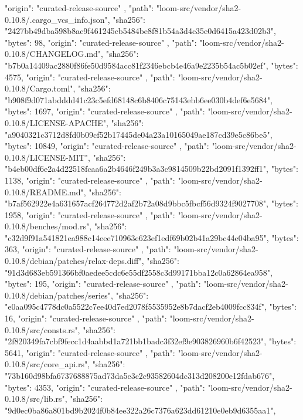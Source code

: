 {{      "origin": "curated-release-source"
    },
    {
      "path": "loom-src/vendor/sha2-0.10.8/.cargo_vcs_info.json",
      "sha256": "2427bb49dba598b8ac9f461245cb5484be8f81b54a3d4c35e0d6415a423d02b3",
      "bytes": 98,
      "origin": "curated-release-source"
    },
    {
      "path": "loom-src/vendor/sha2-0.10.8/CHANGELOG.md",
      "sha256": "b7b0a14409ac2880f86fe50d9584acc81f2346ebcb4e46a9e2235b54ac5b02ef",
      "bytes": 4575,
      "origin": "curated-release-source"
    },
    {
      "path": "loom-src/vendor/sha2-0.10.8/Cargo.toml",
      "sha256": "b908f9d071abdddd41c23c5efd68148c6b8406c75143ebb6ee030b4def6e5684",
      "bytes": 1697,
      "origin": "curated-release-source"
    },
    {
      "path": "loom-src/vendor/sha2-0.10.8/LICENSE-APACHE",
      "sha256": "a9040321c3712d8fd0b09cf52b17445de04a23a10165049ae187cd39e5c86be5",
      "bytes": 10849,
      "origin": "curated-release-source"
    },
    {
      "path": "loom-src/vendor/sha2-0.10.8/LICENSE-MIT",
      "sha256": "b4eb00df6e2a4d22518fcaa6a2b4646f249b3a3c9814509b22bd2091f1392ff1",
      "bytes": 1138,
      "origin": "curated-release-source"
    },
    {
      "path": "loom-src/vendor/sha2-0.10.8/README.md",
      "sha256": "b7af562922e4a631657acf264772d2af2b72a08d9bbc5fbcf56d9324f9027708",
      "bytes": 1958,
      "origin": "curated-release-source"
    },
    {
      "path": "loom-src/vendor/sha2-0.10.8/benches/mod.rs",
      "sha256": "c32d9f91a541821ea988c14eee710963e623ef1edf69b02b41a29bc44e04ba95",
      "bytes": 363,
      "origin": "curated-release-source"
    },
    {
      "path": "loom-src/vendor/sha2-0.10.8/debian/patches/relax-deps.diff",
      "sha256": "91d3d683eb591366bf0aedee5cdc6e55df2558c3d99171bba12c0a62864ea958",
      "bytes": 195,
      "origin": "curated-release-source"
    },
    {
      "path": "loom-src/vendor/sha2-0.10.8/debian/patches/series",
      "sha256": "e0aa095c4778dc0a5522c7ee40d7ed2078f5535952e8b7dacf2eb4009fcc834f",
      "bytes": 16,
      "origin": "curated-release-source"
    },
    {
      "path": "loom-src/vendor/sha2-0.10.8/src/consts.rs",
      "sha256": "2f820349fa7cbf9fecc1d4aabbd1a721bb1badc3f32ef9e903826960b6f42523",
      "bytes": 5641,
      "origin": "curated-release-source"
    },
    {
      "path": "loom-src/vendor/sha2-0.10.8/src/core_api.rs",
      "sha256": "73b160d98bfa6737688875ad73da5e3c2c93582604dc313d208200e12fdab676",
      "bytes": 4353,
      "origin": "curated-release-source"
    },
    {
      "path": "loom-src/vendor/sha2-0.10.8/src/lib.rs",
      "sha256": "9d0ec0ba86a801bd9b2024f0b84ee322a26c7376a623dd61210e0eb9d6355aa1",
}}
